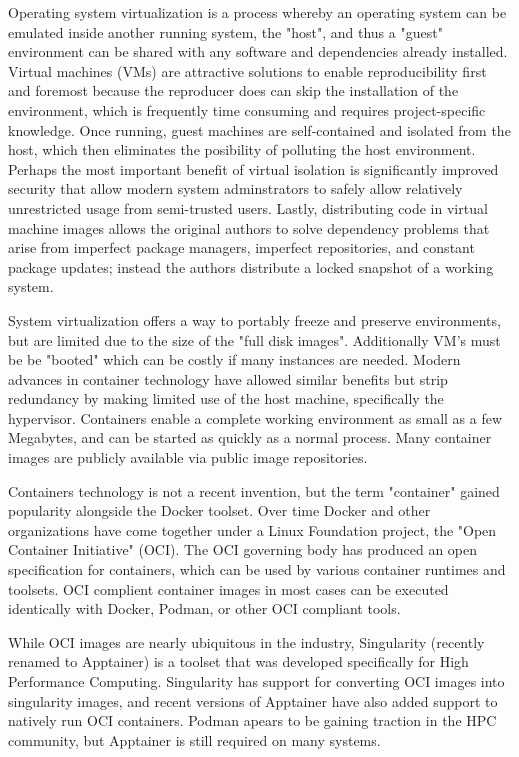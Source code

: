 Operating system virtualization is a process whereby an operating system can be emulated inside another running system, the "host", and thus a "guest" environment can be shared with any software and dependencies already installed.
Virtual machines (VMs) are attractive solutions to enable reproducibility first and foremost because the reproducer does can skip the installation of the environment, which is frequently time consuming and requires project-specific knowledge.
Once running, guest machines are self-contained and isolated from the host, which then eliminates the posibility of polluting the host environment.
Perhaps the most important benefit of virtual isolation is significantly improved security that allow modern system adminstrators to safely allow relatively unrestricted usage from semi-trusted users.
Lastly, distributing code in virtual machine images allows the original authors to solve dependency problems that arise from imperfect package managers, imperfect repositories, and constant package updates; instead the authors distribute a locked snapshot of a working system.

System virtualization offers a way to portably freeze and preserve environments, but are limited due to the size of the "full disk images".
Additionally VM's must be be "booted" which can be costly if many instances are needed.
Modern advances in container technology have allowed similar benefits but strip redundancy by making limited use of the host machine, specifically the hypervisor.
Containers enable a complete working environment as small as a few Megabytes, and can be started as quickly as a normal process.
Many container images are publicly available via public image repositories.

Containers technology is not a recent invention, but the term "container" gained popularity alongside the Docker toolset.
Over time Docker and other organizations have come together under a Linux Foundation project, the "Open Container Initiative" (OCI).
The OCI governing body has produced an open specification for containers, which can be used by various container runtimes and toolsets.
OCI complient container images in most cases can be executed identically with Docker, Podman, or other OCI compliant tools.

While OCI images are nearly ubiquitous in the industry, Singularity (recently renamed to Apptainer) is a toolset that was developed specifically for High Performance Computing.
Singularity has support for converting OCI images into singularity images, and recent versions of Apptainer have also added support to natively run OCI containers.
Podman apears to be gaining traction in the HPC community, but Apptainer is still required on many systems.

